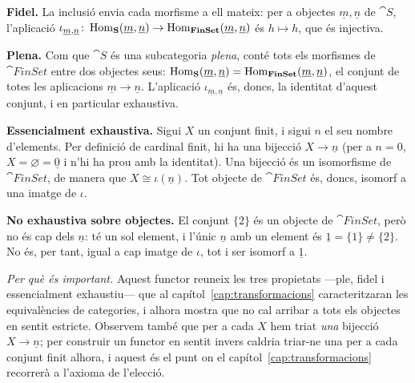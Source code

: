 \begin{solucio}
\textbf{Fidel.} La inclusió envia cada morfisme a ell mateix: per a objectes $\underline{m},\underline{n}$ de $\cat{S}$, l'aplicació $\iota_{\underline{m},\underline{n}}\colon\operatorname{Hom}_{\mathbf{S}}(\underline{m},\underline{n})\to\operatorname{Hom}_{\mathbf{FinSet}}(\underline{m},\underline{n})$ és $h\mapsto h$, que és injectiva.

\textbf{Plena.} Com que $\cat{S}$ és una subcategoria \emph{plena}, conté tots els morfismes de $\cat{FinSet}$ entre dos objectes seus: $\operatorname{Hom}_{\mathbf{S}}(\underline{m},\underline{n})=\operatorname{Hom}_{\mathbf{FinSet}}(\underline{m},\underline{n})$, el conjunt de totes les aplicacions $\underline{m}\to\underline{n}$. L'aplicació $\iota_{\underline{m},\underline{n}}$ és, doncs, la identitat d'aquest conjunt, i en particular exhaustiva.

\textbf{Essencialment exhaustiva.} Sigui $X$ un conjunt finit, i sigui $n$ el seu nombre d'elements. Per definició de cardinal finit, hi ha una bijecció $X\to\underline{n}$ (per a $n=0$, $X=\varnothing=\underline{0}$ i n'hi ha prou amb la identitat). Una bijecció és un isomorfisme de $\cat{FinSet}$, de manera que $X\cong\iota(\underline{n})$. Tot objecte de $\cat{FinSet}$ és, doncs, isomorf a una imatge de $\iota$.

\textbf{No exhaustiva sobre objectes.} El conjunt $\{2\}$ és un objecte de $\cat{FinSet}$, però no és cap dels $\underline{n}$: té un sol element, i l'únic $\underline{n}$ amb un element és $\underline{1}=\{1\}\neq\{2\}$. No és, per tant, igual a cap imatge de $\iota$, tot i ser isomorf a $\underline{1}$.

\emph{Per què és important.} Aquest functor reuneix les tres propietats ---ple, fidel i essencialment exhaustiu--- que al capítol~\ref{cap:transformacions} caracteritzaran les equivalències de categories, i alhora mostra que no cal arribar a tots els objectes en sentit estricte. Observem també que per a cada $X$ hem triat \emph{una} bijecció $X\to\underline{n}$; per construir un functor en sentit invers caldria triar-ne una per a cada conjunt finit alhora, i aquest és el punt on el capítol~\ref{cap:transformacions} recorrerà a l'axioma de l'elecció.
\end{solucio}

